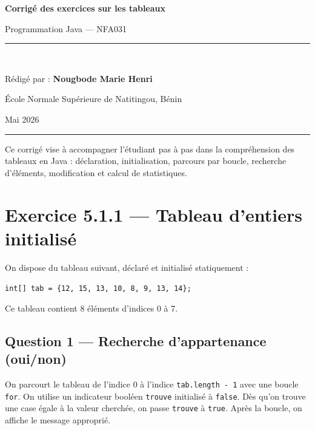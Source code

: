 \documentclass[12pt,a4paper]{article}
\begin{document}
	
	\begin{titlepage}
		\centering
		\vspace*{2cm}
		{\LARGE\bfseries Corrigé des exercices sur les tableaux\par}
		\vspace{0.5cm}
		{\large Programmation Java — NFA031\par}
		\vspace{1cm}
		\rule{0.8\textwidth}{0.4pt}\\[1em]
		{\large Rédigé par : \textbf{Nougbode Marie Henri}\par}
		{\normalsize École Normale Supérieure de Natitingou, Bénin\par}
		\vspace{0.5cm}
		{\normalsize Mai 2026\par}
		\rule{0.8\textwidth}{0.4pt}
		\vfill
		\begin{boiteResultat}[title=Objectifs pédagogiques]
			Ce corrigé vise à accompagner l'étudiant pas à pas dans la compréhension des
			tableaux en Java : déclaration, initialisation, parcours par boucle, recherche
			d'éléments, modification et calcul de statistiques.
		\end{boiteResultat}
	\end{titlepage}
	
	\section*{Exercice 5.1.1 — Tableau d'entiers initialisé}
	
	On dispose du tableau suivant, déclaré et initialisé statiquement :
	\begin{center}
		\texttt{int[] tab = \{12, 15, 13, 10, 8, 9, 13, 14\};}
	\end{center}
	Ce tableau contient 8 éléments d'indices 0 à 7.
	
	\subsection*{Question 1 — Recherche d'appartenance (oui/non)}
	
	\begin{boiteRaisonnement}
		On parcourt le tableau de l'indice 0 à l'indice \texttt{tab.length - 1} avec une boucle
		\texttt{for}. On utilise un indicateur booléen \texttt{trouve} initialisé à \texttt{false}.
		Dès qu'on trouve une case égale à la valeur cherchée, on passe \texttt{trouve} à
		\texttt{true}. Après la boucle, on affiche le message approprié.
	\end{boiteRaisonnement}
	
\end{document}
